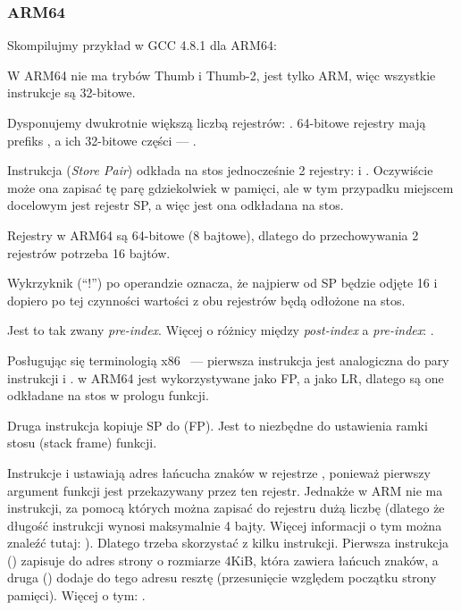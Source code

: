\subsubsection{ARM64}


Skompilujmy przykład w GCC 4.8.1 dla ARM64:



W ARM64 nie ma trybów Thumb i Thumb-2, jest tylko ARM, więc wszystkie instrukcje są 32-bitowe.

Dysponujemy dwukrotnie większą liczbą rejestrów: .
64-bitowe rejestry mają prefiks
, a ich 32-bitowe części --- .

Instrukcja  (\emph{Store Pair}) 
odkłada na stos jednocześnie 2 rejestry:  i .
Oczywiście może ona zapisać tę parę gdziekolwiek w pamięci, ale w tym przypadku miejscem docelowym jest rejestr \ac{SP}, a więc jest ona odkładana na stos.

Rejestry w ARM64 są 64-bitowe (8 bajtowe), dlatego do przechowywania 2 rejestrów potrzeba 16 bajtów.

Wykrzyknik (``!'') po operandzie oznacza, że najpierw od \ac{SP} będzie odjęte 16 i dopiero po tej czynności wartości z obu rejestrów będą odłożone na stos.

Jest to tak zwany \emph{pre-index}.
Więcej o różnicy między \emph{post-index} a \emph{pre-index}: .

Posługując się terminologią x86 ~--- pierwsza instrukcja jest analogiczna do pary instrukcji  i .
 w ARM64 jest wykorzystywane jako \ac{FP}, a  
jako \ac{LR}, dlatego są one odkładane na stos w prologu funkcji.

Druga instrukcja kopiuje \ac{SP} do  (\ac{FP}).
Jest to niezbędne do ustawienia ramki stosu (stack frame) funkcji.

\label{pointers_ADRP_and_ADD}
Instrukcje  i \ADD ustawiają adres łańcucha znaków  w rejestrze ,
ponieważ pierwszy argument funkcji jest przekazywany przez ten rejestr.
Jednakże w ARM nie ma instrukcji, za pomocą których można zapisać do rejestru dużą liczbę 
(dlatego że długość instrukcji wynosi maksymalnie 4 bajty. Więcej informacji o tym można znaleźć tutaj: ).
Dlatego trzeba skorzystać z kilku instrukcji.
Pierwsza instrukcja () zapisuje do  adres strony o rozmiarze 4KiB, która zawiera łańcuch znaków,
a druga (\ADD) dodaje do tego adresu resztę (przesunięcie względem początku strony pamięci).
Więcej o tym: .

